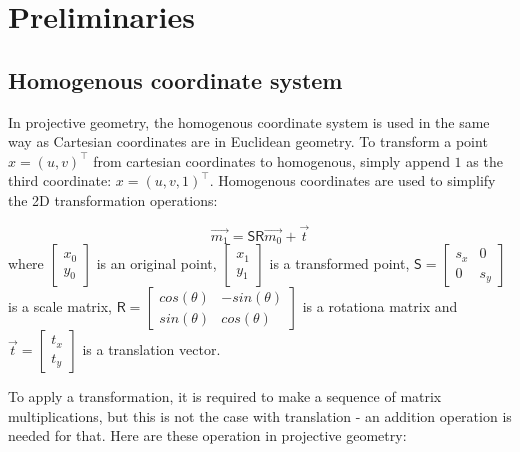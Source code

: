 \chapter{Preliminaries}

\label{chapter:preliminaries}
\section{Homogenous coordinate system}

In projective geometry, the homogenous coordinate system is used in the same way as Cartesian coordinates are in Euclidean geometry.
To transform a point $x=(u, v)^\top$ from cartesian coordinates to homogenous, simply append $1$ as the third coordinate: $x=(u, v, 1)^\top$.
Homogenous coordinates are used to simplify the 2D transformation operations: 


\begin{equation}
    \vec{m_1} = 
    \pmb{\mathsf{S}} \pmb{\mathsf{R}}
    \vec{m_0}
    + \vec{t}
\end{equation}
where 
$\begin{bmatrix} x_0 \\ y_0 \end{bmatrix}$
is an original point,
$\begin{bmatrix} x_1 \\ y_1 \end{bmatrix}$
is a transformed point,
$\pmb{\mathsf{S}} = \begin{bmatrix} s_x & 0 \\ 0 & s_y \end{bmatrix}$ 
is a scale matrix, 
$\pmb{\mathsf{R}} = \begin{bmatrix} cos(\theta) & -sin(\theta) \\ sin(\theta) & cos(\theta) \end{bmatrix}$ 
is a rotationa matrix and 
$\vec{t} = \begin{bmatrix} t_x \\ t_y \end{bmatrix}$ 
is a translation vector.

To apply a transformation, it is required to make a sequence of matrix multiplications, but this is not the case with translation - an addition operation is needed for that. 
Here are these operation in projective geometry:

